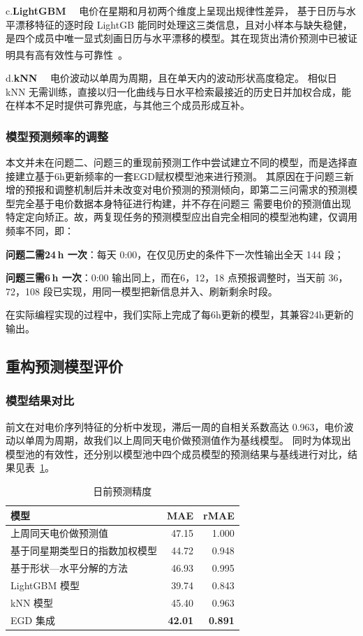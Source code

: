 \documentclass[zihao=-4,a4paper,fontset=none]{ctexart}
\newcommand{\upcite}[1]{\textsuperscript{\cite{#1}}}
\begin{document}
c.\textbf{LightGBM}   \ \  电价在星期和月初两个维度上呈现出规律性差异，
基于日历与水平漂移特征的逐时段 LightGB 能同时处理这三类信息，且对小样本与缺失稳健，是四个成员中唯一显式刻画日历与水平漂移的模型。其在现货出清价预测中已被证明具有高有效性与可靠性~\upcite{shaoy2025}。

d.\textbf{kNN}    \ \  电价波动以单周为周期，且在单天内的波动形状高度稳定。
相似日 kNN 无需训练，直接以归一化曲线与日水平检索最接近的历史日并加权合成，能在样本不足时提供可靠兜底，与其他三个成员形成互补。

\subsubsection{模型预测频率的调整}

本文并未在问题二、问题三的重现前预测工作中尝试建立不同的模型，而是选择直接建立基于6h更新频率的一套EGD赋权模型池来进行预测。
其原因在于问题三新增的预报和调整机制后并未改变对电价预测的预测倾向，即第二三问需求的预测模型完全基于电价数据本身特征进行构建，并不存在问题三
需要电价的预测值出现特定定向矫正。故，两复现任务的预测模型应出自完全相同的模型池构建，仅调用频率不同，即：

\textbf{问题二需24\,h 一次}：每天 0:00，在仅见历史的条件下一次性输出全天 144 段；

\textbf{问题三需6\,h 一次}：0:00 输出同上，而在6，12，18 点预报调整时，当天前 36，72，108 段已实现，用同一模型把新信息并入、刷新剩余时段。

在实际编程实现的过程中，我们实际上完成了每6h更新的模型，其兼容24h更新的输出。



\subsection{重构预测模型评价}


\subsubsection{模型结果对比}
前文在对电价序列特征的分析中发现，滞后一周的自相关系数高达 0.963，电价波动以单周为周期，故我们以上周同天电价做预测值作为基线模型。
同时为体现出模型池的有效性，还分别以模型池中四个成员模型的预测结果与基线进行对比，结果见表~\ref{tab:p4mae}。

\begin{table}[htbp]
\centering
\caption{日前预测精度}
{\small
\begin{tabular}{lrr}
\toprule
模型 & MAE & rMAE \\
\midrule
上周同天电价做预测值 & 47.15 & 1.000 \\
基于同星期类型日的指数加权模型 & 44.72 & 0.948 \\
基于形状—水平分解的方法 & 46.93 & 0.995 \\
LightGBM 模型 & 39.74 & 0.843 \\
kNN 模型 & 45.40 & 0.963 \\
EGD 集成 & \textbf{42.01} & \textbf{0.891} \\
\bottomrule
\end{tabular}}
\label{tab:p4mae}
\end{table}
\end{document}
